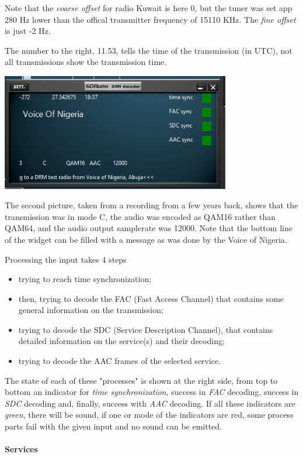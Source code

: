 \documentclass[10pt]{article}
\begin{document}
Note that the {\em coarse offset} for radio Kuwait is here 0, but the
tuner was set app 280 Hz lower than the offical transmitter frequency
of 15110 KHz. The {\em fine offset} is just -2 Hz.

The number to the right, 11.53, tells the 
time of the transmission (in UTC), not all transmissions show the
transmission time.
\par
\includegraphics[width=100mm]{drm-decoder-widget.png}
\par
The second picture, taken from a recording from a few years back,
shows that the transmission was in mode C, the audio was encoded as QAM16
rather than QAM64, and the audio output samplerate was 12000.
Note that the bottom line of the widget can be filled with a message
as was done by the Voice of Nigeria.
\par
Processing the input takes 4 steps
\begin{itemize}
\item trying to reach time synchronization;
\item then, trying to decode the FAC (Fast Access Channel) that contains
some general information on the transmission;
\item trying to decode the SDC (Service Description Channel), that contains
detailed information on the service(s) and their decoding;
\item trying to decode the AAC frames of the selected service.
\end{itemize}
The state of each of these "processes" is shown at the right side,
from top to bottom an indicator for {\em time synchronization}, success
in {\em FAC} decoding, success in {\em SDC} decoding and, finally, success
with {\em AAC} decoding. 
If all these indicators are {\em green}, there will be sound, if one or
mode of the indicators are red, some process parts fail with the given input
and no sound can be emitted.
\paragraph{Services}
\end{document}
